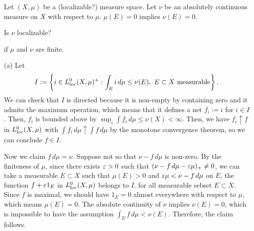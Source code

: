 \documentclass{../../large}
\begin{document}
\begin{prb}
Let $(X,\mu)$ be a (localizable?) measure space.
Let $\nu$ be an absolutely continuous measure on $X$ with respect to $\mu$.
$\mu(E)=0$ implies $\nu(E)=0$.

Is $\nu$ localizable?
\begin{parts}
\item if $\mu$ and $\nu$ are finite.
\end{parts}
\end{prb}
\begin{pf}
(a)
Let
\[I:=\left\{i\in L_{\mathrm{loc}}^0(X,\mu)^+:\int_Ei\,d\mu\le\nu(E),\ E\subset X\text{ measurable}\right\}.\]
We can check that $I$ is directed because it is non-empty by containing zero and it admits the maximum operation, which means that it defines a net $f_i:=i$ for $i\in I$.
Then, $f_i$ is bounded above by $\sup_i\int f_i\,d\mu\le\nu(X)<\infty$.
Then, we have $f_i\uparrow f$ in $L_{\mathrm{loc}}^0(X,\mu)$ with $\int f_i\,d\mu\uparrow\int f\,d\mu$ by the monotone convergence theorem, so we can conclude $f\in I$.

Now we claim $f\,d\mu=\nu$.
Suppose not so that $\nu-f\,d\mu$ is non-zero.
By the finiteness of $\mu$, since there exists $\varepsilon>0$ such that $(\nu-f\,d\mu-\varepsilon\mu)_+\ne0$, we can take a measurable $E\subset X$ such that $\mu(E)>0$ and $\varepsilon\mu<\nu-f\,d\mu$ on $E$, the function $f+\varepsilon1_E$ in $L_{\mathrm{loc}}^0(X,\mu)$ belongs to $I$.
for all measurable sebset $E\subset X$.
Since $f$ is maximal, we should have $1_E=0$ almost everywhere with respect to $\mu$, which means $\mu(E)=0$.
The absolute continuity of $\nu$ implies $\nu(E)=0$, which is impossible to have the assumption $\int_Ef\,d\mu<\nu(E)$.
Therefore, the claim follows.

\end{pf}

\begin{prb}
\end{prb}




\begin{prb}[Convolution?]
\end{prb}
\begin{prb}
\end{prb}
\begin{prb}
\end{prb}
\end{document}
